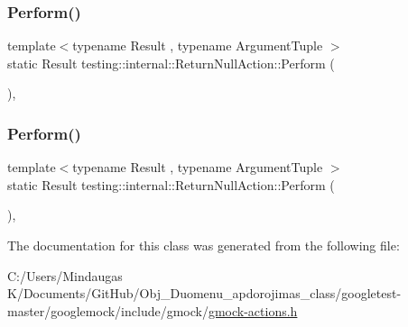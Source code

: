 \mbox{\label{classtesting_1_1internal_1_1_return_null_action_a6ce1fba236686df93070320b399e4f32}} 
\subsubsection{\texorpdfstring{Perform()}{Perform()}\hspace{0.1cm}{\footnotesize\ttfamily [2/3]}}
{\footnotesize\ttfamily template$<$typename Result , typename Argument\+Tuple $>$ \\
static Result testing\+::internal\+::\+Return\+Null\+Action\+::\+Perform (\begin{DoxyParamCaption}\item[{const Argument\+Tuple \&}]{ }\end{DoxyParamCaption})\hspace{0.3cm}{\ttfamily [inline]}, {\ttfamily [static]}}

\mbox{\label{classtesting_1_1internal_1_1_return_null_action_a6ce1fba236686df93070320b399e4f32}} 
\subsubsection{\texorpdfstring{Perform()}{Perform()}\hspace{0.1cm}{\footnotesize\ttfamily [3/3]}}
{\footnotesize\ttfamily template$<$typename Result , typename Argument\+Tuple $>$ \\
static Result testing\+::internal\+::\+Return\+Null\+Action\+::\+Perform (\begin{DoxyParamCaption}\item[{const Argument\+Tuple \&}]{ }\end{DoxyParamCaption})\hspace{0.3cm}{\ttfamily [inline]}, {\ttfamily [static]}}



The documentation for this class was generated from the following file\+:\begin{DoxyCompactItemize}
\item 
C\+:/\+Users/\+Mindaugas K/\+Documents/\+Git\+Hub/\+Obj\+\_\+\+Duomenu\+\_\+apdorojimas\+\_\+class/googletest-\/master/googlemock/include/gmock/\mbox{\hyperlink{googletest-master_2googlemock_2include_2gmock_2gmock-actions_8h}{gmock-\/actions.\+h}}\end{DoxyCompactItemize}
